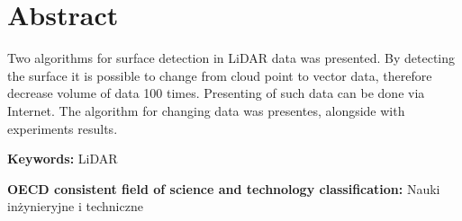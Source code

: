 \chapter*{Abstract}

Two algorithms for surface detection in LiDAR data was presented. By detecting the
surface it is possible to change from cloud point to vector data, therefore decrease
volume of data 100 times. Presenting of such data can be done via Internet. The algorithm
for changing data was presentes, alongside with experiments results.

\bigskip

\noindent\textbf{Keywords:} LiDAR

\bigskip

\noindent\textbf{OECD consistent field of science and technology classification:} Nauki inżynieryjne i techniczne
